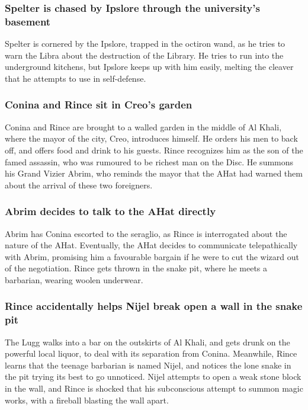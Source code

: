 \subsubsection{\Gls{Spelter} is chased by \Gls{Ipslore} through the university's basement}
\Gls{Spelter} is cornered by the \Gls{Ipslore}, trapped in the octiron wand, as he tries to warn
the \Gls{Libra} about the destruction of the Library. He tries to run into the underground kitchens,
but \Gls{Ipslore} keeps up with him easily, melting the cleaver that he attempts to use in
self-defense.

\subsubsection{\Gls{Conina} and \Gls{Rince} sit in \Gls{Creo}'s garden}
\Gls{Conina} and \Gls{Rince} are brought to a walled garden in the middle of Al Khali, where the
mayor of the city, \Gls{Creo}, introduces himself. He orders his men to back off, and offers food
and drink to his guests. \Gls{Rince} recognizes him as the son of the famed assassin, who was
rumoured to be richest man on the Disc. He summons his Grand Vizier \Gls{Abrim}, who reminds the
mayor that the \Gls{AHat} had warned them about the arrival of these two foreigners.

\subsubsection{\Gls{Abrim} decides to talk to the \Gls{AHat} directly}
\Gls{Abrim} has \Gls{Conina} escorted to the seraglio, as \Gls{Rince} is interrogated about the
nature of the \Gls{AHat}. Eventually, the \Gls{AHat} decides to communicate telepathically with
\Gls{Abrim}, promising him a favourable bargain if he were to cut the wizard out of the negotiation.
\Gls{Rince} gets thrown in the snake pit, where he meets a barbarian, wearing woolen underwear.

\subsubsection{\Gls{Rince} accidentally helps \Gls{Nijel} break open a wall in the snake pit}
The \Gls{Lugg} walks into a bar on the outskirts of Al Khali, and gets drunk on the powerful local
liquor, to deal with its separation from \Gls{Conina}. Meanwhile, \Gls{Rince} learns that the
teenage barbarian is named \Gls{Nijel}, and notices the lone snake in the pit trying its best to
go unnoticed. \Gls{Nijel} attempts to open a weak stone block in the wall, and \Gls{Rince} is
shocked that his subconscious attempt to summon magic works, with a fireball blasting the wall
apart.

